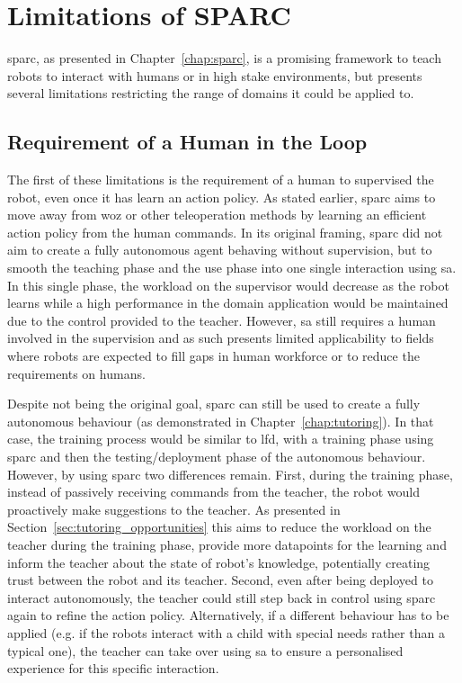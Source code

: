 \section{Limitations of SPARC} \label{sec:disc_limitations}

\gls{sparc}, as presented in Chapter~\ref{chap:sparc}, is a promising framework to teach robots to interact with humans or in high stake environments, but presents several limitations restricting the range of domains it could be applied to.

\subsection{Requirement of a Human in the Loop}
The first of these limitations is the requirement of a human to supervised the robot, even once it has learn an action policy. As stated earlier, \gls{sparc} aims to move away from \gls{woz} or other teleoperation methods by learning an efficient action policy from the human commands. In its original framing, \gls{sparc} did not aim to create a fully autonomous agent behaving without supervision, but to smooth the teaching phase and the use phase into one single interaction using \gls{sa}. In this single phase, the workload on the supervisor would decrease as the robot learns while a high performance in the domain application would be maintained due to the control provided to the teacher. However, \gls{sa} still requires a human involved in the supervision and as such presents limited applicability to fields where robots are expected to fill gaps in human workforce or to reduce the requirements on humans. 

Despite not being the original goal, \gls{sparc} can still be used to create a fully autonomous behaviour (as demonstrated in Chapter~\ref{chap:tutoring}). In that case, the training process would be similar to \gls{lfd}, with a training phase using \gls{sparc} and then the testing/deployment phase of the autonomous behaviour. However, by using \gls{sparc} two differences remain. First, during the training phase, instead of passively receiving commands from the teacher, the robot would proactively make suggestions to the teacher. As presented in Section~\ref{sec:tutoring_opportunities} this aims to reduce the workload on the teacher during the training phase, provide more datapoints for the learning and inform the teacher about the state of robot's knowledge, potentially creating trust between the robot and its teacher. Second, even after being deployed to interact autonomously, the teacher could still step back in control using \gls{sparc} again to refine the action policy. Alternatively, if a different behaviour has to be applied (e.g. if the robots interact with a child with special needs rather than a typical one), the teacher can take over using \gls{sa} to ensure a personalised experience for this specific interaction.

